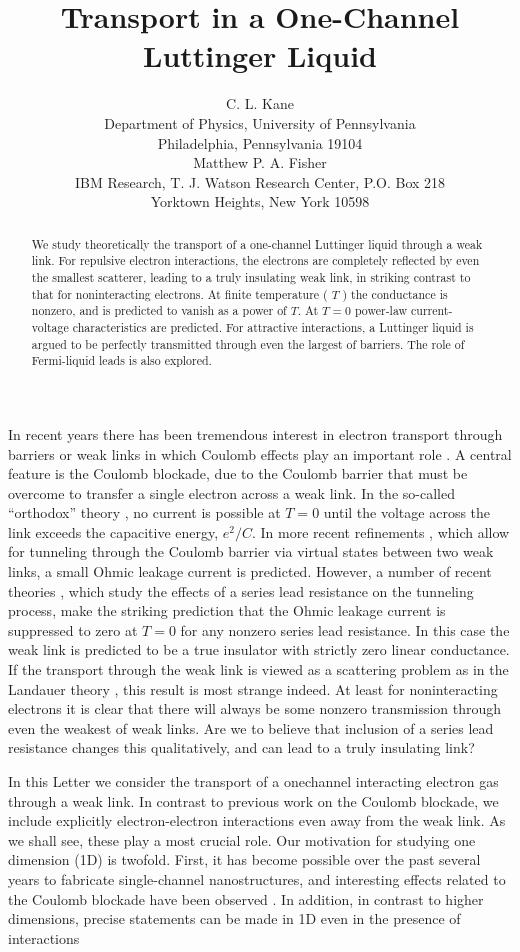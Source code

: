 \documentclass[11pt]{article}
\title{Transport in a One-Channel Luttinger Liquid}
\author{%
C. L. Kane\\
{\small Department of Physics, University of Pennsylvania}\\
{\small Philadelphia, Pennsylvania 19104}\\[0.75em]
Matthew P. A. Fisher\\
{\small IBM Research, T. J. Watson Research Center, P.O. Box 218}\\
{\small Yorktown Heights, New York 10598}}
\date{}
\begin{document}
\maketitle

\begin{abstract}
We study theoretically the transport of a one-channel Luttinger liquid through a weak link. For repulsive electron interactions, the electrons are completely reflected by even the smallest scatterer, leading to a truly insulating weak link, in striking contrast to that for noninteracting electrons. At finite temperature ( $T$ ) the conductance is nonzero, and is predicted to vanish as a power of $T$. At $T=0$ power-law current-voltage characteristics are predicted. For attractive interactions, a Luttinger liquid is argued to be perfectly transmitted through even the largest of barriers. The role of Fermi-liquid leads is also explored.
\end{abstract}

In recent years there has been tremendous interest in electron transport through barriers or weak links in which Coulomb effects play an important role \cite{ref1}. A central feature is the Coulomb blockade, due to the Coulomb barrier that must be overcome to transfer a single electron across a weak link. In the so-called ``orthodox'' theory \cite{ref2}, no current is possible at $T=0$ until the voltage across the link exceeds the capacitive energy, $e^{2} / C$. In more recent refinements \cite{ref3}, which allow for tunneling through the Coulomb barrier via virtual states between two weak links, a small Ohmic leakage current is predicted. However, a number of recent theories \cite{ref4,ref5}, which study the effects of a series lead resistance on the tunneling process, make the striking prediction that the Ohmic leakage current is suppressed to zero at $T=0$ for any nonzero series lead resistance. In this case the weak link is predicted to be a true insulator with strictly zero linear conductance. If the transport through the weak link is viewed as a scattering problem as in the Landauer theory \cite{ref6}, this result is most strange indeed. At least for noninteracting electrons it is clear that there will always be some nonzero transmission through even the weakest of weak links. Are we to believe that inclusion of a series lead resistance changes this qualitatively, and can lead to a truly insulating link?

In this Letter we consider the transport of a onechannel interacting electron gas through a weak link. In contrast to previous work on the Coulomb blockade, we include explicitly electron-electron interactions even away from the weak link. As we shall see, these play a most crucial role. Our motivation for studying one dimension (1D) is twofold. First, it has become possible over the past several years to fabricate single-channel nanostructures, and interesting effects related to the Coulomb blockade have been observed \cite{ref7}. In addition, in contrast to higher dimensions, precise statements can be made in 1D even in the presence of interactions
\end{document}
